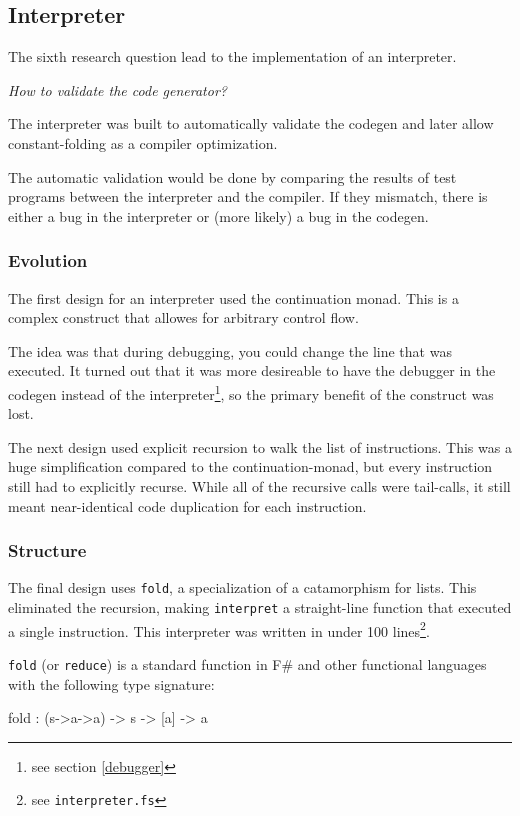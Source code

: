 \subsection{Interpreter}
The sixth research question lead to the implementation of an interpreter.

\textit{How to validate the code generator?}

The interpreter was built to automatically validate the codegen and later allow constant-folding as a compiler optimization.

The automatic validation would be done by comparing the results of test programs between the interpreter and the compiler.
If they mismatch, there is either a bug in the interpreter or (more likely) a bug in the codegen.

\subsubsection{Evolution}
The first design for an interpreter used the continuation monad.
This is a complex construct that allowes for arbitrary control flow.

The idea was that during debugging, you could change the line that was executed.
It turned out that it was more desireable to have the debugger in the codegen instead of the interpreter\footnote{see section \ref{debugger}}, so the primary benefit of the construct was lost.

The next design used explicit recursion to walk the list of instructions.
This was a huge simplification compared to the continuation-monad, but every instruction still had to explicitly recurse.
While all of the recursive calls were tail-calls\cite{tailcalls}, it still meant near-identical code duplication for each instruction.

\subsubsection{Structure}
The final design uses \verb|fold|, a specialization of a catamorphism for lists\cite{catamorphism}.
This eliminated the recursion, making \verb|interpret| a straight-line function that executed a single instruction.
This interpreter was written in under 100 lines\footnote{see \texttt{interpreter.fs}}.

\verb|fold| (or \verb|reduce|) is a standard function in F\# and other functional languages with the following type signature:

\begin{FS}
    fold : (s->a->a) -> s -> [a] -> a
\end{FS}

